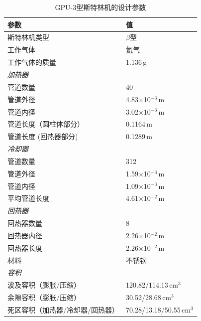 \begin{table}[htbp]\footnotesize
	\caption{GPU-3型斯特林机的设计参数}
	\centering
	\begin{tabular}{ll}
		\toprule
		参数				&	值\\
		\midrule
		斯特林机类型					&	$\beta$型\\
		工作气体			&	氦气\\
		工作气体的质量	&	1.136\,g\\
		\emph{加热器}			&\\
		管道数量		&	40\\
		管道外径	&	4.83$\times$10$^{-3}\,\mathrm{m}$\\
		管道内径	&	3.02$\times$10$^{-3}\,\mathrm{m}$\\
		管道长度（圆柱体部分）		&	0.1164\,m\\
		管道长度 (回热器部分)		&	0.1289\,m\\
		\emph{冷却器}			&\\
		管道数量		&	312\\
		管道外径	&	1.59$\times$10$^{-3}\,\mathrm{m}$\\
		管道内径	&	1.09$\times$10$^{-3}\,\mathrm{m}$\\
		平均管道长度		&	4.61$\times$10$^{-2}\,\mathrm{m}$\\
		\emph{回热器}		&\\
		回热器数量	&	8\\
		回热器内径	&	2.26$\times$10$^{-2}\,\mathrm{m}$\\
		回热器长度		&	2.26$\times$10$^{-2}\,\mathrm{m}$\\
		材料				&	不锈钢\\
		\emph{容积}			&\\
		波及容积（膨胀/压缩）	&	120.82/114.13$\,\mathrm{cm}^3$\\
		余隙容积（膨胀/压缩）	&	30.52/28.68$\,\mathrm{cm}^3$\\
		死区容积（加热器/冷却器/回热器）	&	70.28/13.18/50.55$\,\mathrm{cm}^3$\\
		\bottomrule
	\end{tabular}
	\label{tab:GPU3parameters}
\end{table}

